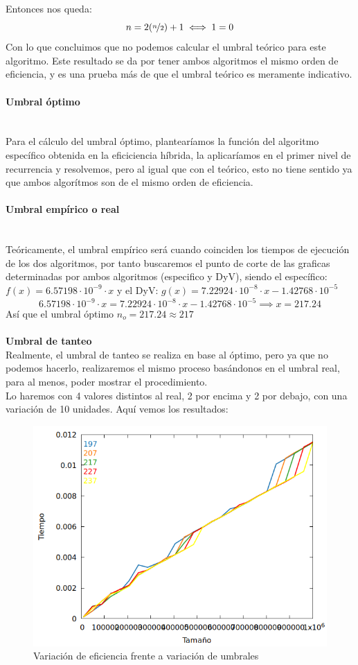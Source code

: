 \documentclass{article}
\newcommand{\myparagraph}[1]{\paragraph{#1}\mbox{}\\}
\begin{document}
    Entonces nos queda: 
    $$n = 2(\nicefrac{n}{2}) +1 \iff 1=0$$
\[
\]
    Con lo que concluimos que no podemos calcular el umbral teórico
    para este algoritmo. Este resultado se da por tener ambos algoritmos
    el mismo orden de eficiencia, y es una prueba más de que el umbral teórico
    es meramente indicativo. 
    \myparagraph{Umbral óptimo}
    Para el cálculo del umbral óptimo, plantearíamos la función del algoritmo específico obtenida en la eficiciencia híbrida, la aplicaríamos en el primer nivel de recurrencia y resolvemos, pero al igual que con el teórico, esto no tiene sentido ya que ambos algorítmos son de el mismo orden de eficiencia.
    \myparagraph{Umbral empírico o real} 
    Teóricamente, el umbral empírico será cuando coinciden los tiempos de ejecución de los dos algoritmos, por tanto buscaremos el punto de corte de las graficas determinadas por ambos algoritmos (especifico y DyV), siendo el específico:
    $f(x) = 6.57198\cdot 10^{-9} \cdot x$
    y el DyV: 
    $g(x) = 7.22924 \cdot 10^{-8}\cdot x - 1.42768 \cdot 10^{-5}$
    $$
        6.57198\cdot 10^{-9} \cdot x
        =7.22924 · 10^{-8}\cdot x - 1.42768 · 10^{-5}
     \implies x= 217.24
    $$
    Así que el umbral óptimo $n_o = 217.24 \approx 217$ \\ \\
    \textbf{Umbral de tanteo}\\
    Realmente, el umbral de tanteo se realiza en base al óptimo, pero ya que no podemos hacerlo, realizaremos el mismo proceso basándonos en el umbral real, para al menos, poder mostrar el procedimiento. \\
    Lo haremos con 4 valores distintos al real, 2 por encima y 2 por debajo, con una variación de 10 unidades. Aquí vemos los resultados:\\
    \begin{figure}[!hbt]
        \centering
        \includegraphics[scale = 0.4]{P1/UmmbralesTanteo.png}
        \caption{\centering Variación de eficiencia frente a variación de umbrales}
        
    \end{figure}\\
\end{document}
